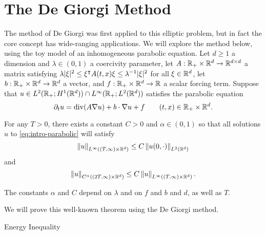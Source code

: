 \section{The De Giorgi Method}

The method of De Giorgi was first applied to this elliptic problem, but in fact the core concept has wide-ranging applications.  We will explore the method below, using the toy model of an inhomogeneous parabolic equation.  Let $d \geq 1$ a dimension and $\lambda \in (0,1)$ a coercivity parameter, let $A:\mathbb{R}_+\times\mathbb{R}^d \to \mathbb{R}^{d\times d}$ a matrix satisfying $\lambda |\xi|^2 \leq \xi^\intercal A(t,x) \xi \leq \lambda^{-1} |\xi|^2$ for all $\xi \in \mathbb{R}^d$, let $b:\mathbb{R}_+\times\mathbb{R}^d \to \mathbb{R}^d$ a vector, and $f:\mathbb{R}_+\times\mathbb{R}^d \to \mathbb{R}$ a scalar forcing term.  Suppose that $u \in L^2(\mathbb{R}_+;H^1(\mathbb{R}^d)) \cap L^\infty(\mathbb{R}_+; L^2(\mathbb{R}^d))$ satisfies the parabolic equation
\begin{equation} \label{eq:intro-parabolic}
\partial_t u = \operatorname{div}(A \nabla u) + b\cdot\nabla u + f \qquad (t,x) \in \mathbb{R}_+\times\mathbb{R}^d.
\end{equation}

\begin{theorem} \label{thm:intro-DG toy theorem}
For any $T > 0$, there exists a constant $C > 0$ and $\alpha \in (0,1)$ so that all solutions $u$ to \eqref{eq:intro-parabolic} will satisfy 
\[ \left\lVert u\right\rVert_{L^\infty((T,\infty)\times\mathbb{R}^d)} \leq C \left\lVert u(0,\cdot)\right\rVert_{L^2(\mathbb{R}^d)} \]
and
\[ \left\lVert u\right\rVert_{C^\alpha((2T,\infty)\times\mathbb{R}^d)} \leq C \left\lVert u\right\rVert_{L^\infty((T,\infty)\times\mathbb{R}^d)}. \]

The constants $\alpha$ and $C$ depend on $\lambda$ and on $f$ and $b$ and $d$, as well as $T$.  
\end{theorem}

We will prove this well-known theorem using the De Giorgi method.  

\begin{theorem}
Energy Inequality
\end{theorem}


